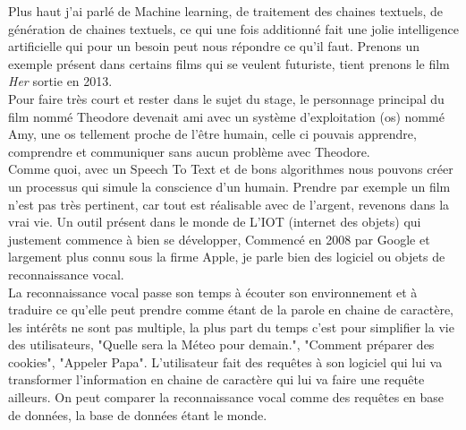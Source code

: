 Plus haut j'ai parlé de Machine learning, de traitement des chaines textuels, de génération de chaines textuels, ce qui une fois additionné fait une jolie intelligence artificielle qui pour un besoin peut nous répondre ce qu'il faut. Prenons un exemple présent dans certains films qui se veulent futuriste, tient prenons le film \textit{Her} sortie en 2013.\\
\linebreak
Pour faire très court et rester dans le sujet du stage, le personnage principal du film nommé Theodore devenait ami avec un système d'exploitation (os) nommé Amy, une os tellement proche de l'être humain, celle ci pouvais apprendre, comprendre et communiquer sans aucun problème avec Theodore.\\
Comme quoi, avec un Speech To Text et de bons algorithmes nous pouvons créer un processus qui simule la conscience d'un humain. Prendre par exemple un film n'est pas très pertinent, car tout est réalisable avec de l'argent, revenons dans la vrai vie. Un outil présent dans le monde de L'IOT (internet des objets) qui justement commence à bien se développer, Commencé en 2008 par Google et largement plus connu sous la firme Apple, je parle bien des logiciel ou objets de reconnaissance vocal.\\
\linebreak
La reconnaissance vocal passe son temps à écouter son environnement et à traduire ce qu'elle peut prendre comme étant de la parole en chaine de caractère, les intérêts ne sont pas multiple, la plus part du temps c'est pour simplifier la vie des utilisateurs, "Quelle sera la Méteo pour demain.", "Comment préparer des cookies", "Appeler Papa". L'utilisateur fait des requêtes à son logiciel qui lui va transformer l'information en chaine de caractère qui lui va faire une requête ailleurs. On peut comparer la reconnaissance vocal comme des requêtes en base de données, la base de données étant le monde.\\
\pagebreak

